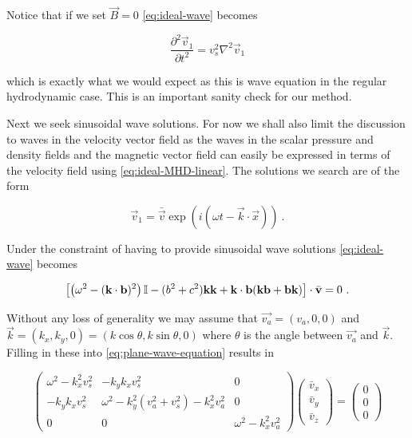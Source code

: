 Notice that if we set $\vec{B} = 0$ \cref{eq:ideal-wave} becomes

$$ \frac{\partial^2 \vec{v}_1}{\partial t^2} = v_s^2 \nabla^2 \vec{v}_1 $$

which is exactly what we would expect as this is wave equation in the regular hydrodynamic case. This is an important sanity check for our method.

Next we seek sinusoidal wave solutions. 
For now we shall also limit the discussion to waves in the velocity vector field as the waves in the scalar pressure and density fields and the magnetic vector field can easily be expressed in terms of the velocity field using \cref{eq:ideal-MHD-linear}. The solutions we search are of the form

$$ \vec{v}_1 = \bar{\vec{v}} \exp(i(\omega t - \vec{k} \cdot \vec{x})) \ .$$ 

Under the constraint of having to provide sinusoidal wave solutions \cref{eq:ideal-wave} becomes

\begin{equation}
\label{eq:plane-wave-equation}
\left[ \left( \omega^2 - (\mathbf{k}\cdot \mathbf{b})^2 \right) \mathbb{I} - (b^2 + c^2)\mathbf{k}\mathbf{k} + \mathbf{k} \cdot \mathbf{b}(\mathbf{k}\mathbf{b} + \mathbf{b}\mathbf{k}) \right] \cdot \bar{\mathbf{v}} = 0 \ .
\end{equation} 

Without any loss of generality we may assume that $\vec{v_a} = (v_a,0,0)$ and $\vec{k} = (k_x, k_y, 0) = (k\cos\theta, k\sin\theta, 0)$ where $\theta$ is the angle between $\vec{v_a}$ and $\vec{k}$. Filling in these into \cref{eq:plane-wave-equation} results in

\begin{equation}
\label{eq:plane-wave-equation-matrixform}
\begin{pmatrix}
 \omega^ 2-k_x^2 v_s^2  &  - k_y k_x v_s^2  & 0\\
- k_y k_x v_s^2  &  \omega^2  - k_y^2 (v_a^2 + v_s^2) - k_x^2 v_a^2  &  0\\
0  &  0  & \omega^2  -  k_x^2 v_a^2
\end{pmatrix}
\begin{pmatrix}
\bar{v}_x \\
\bar{v}_y \\
\bar{v}_z
\end{pmatrix}
 = 
\begin{pmatrix}
0 \\
0 \\
0
\end{pmatrix}
\end{equation} 


